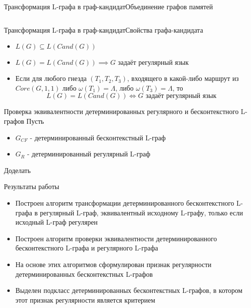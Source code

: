 \documentclass{beamer}
\begin{document}
\begin{frame} {Трансформация L-графа в граф-кандидат}{Объединение графов памятей}
{\begin{columns}
    \end{columns}
  }
\end{frame}

\begin{frame} {Трансформация L-графа в граф-кандидат}{Свойства графа-кандидата}
\begin{itemize}
  \item $L(G) \subseteq L(Cand(G))$
  \item $L(G) = L(Cand(G)) \implies G\text{ задаёт регулярный язык }$
  \item Если для любого гнезда $(T_1,T_2,T_3)$, входящего в какой-либо маршрут из $Core(G,1,1)$ либо $\omega(T_1) = \Lambda$, либо $\omega(T_3) = \Lambda$, то $$L(G) = L(Cand(G)) \Longleftrightarrow G\text{ задаёт регулярный язык }$$
\end{itemize}
\end{frame}

\begin{frame} {Проверка эквивалентности детерминированных регулярного и бесконтекстного L-графов}
Пусть
\begin{itemize}
  \item $G_{CF}$ - детерминированный бесконтекстный L-граф
  \item $G_R$ - детерминированный регулярный L-граф
\end{itemize}
{\color{red} Доделать}
\end{frame}

\begin{frame} {Результаты работы}
\begin{itemize}
  \item Построен алгоритм трансформации детерминированного бесконтекстного L-графа в регулярный L-граф, эквивалентный исходному L-графу, только если исходный L-граф регулярен
  \item Построен алгоритм проверки эквивалентности детерминированного бесконтекстного L-графа и регулярного L-графа
  \item На основе этих алгоритмов сформулирован признак регулярности детерминированных бесконтекстных L-графов
  \item Выделен подкласс детерминированных бесконтекстных L-графов, в котором этот признак регулярности является критерием
\end{itemize}
\end{frame}
\end{document}
